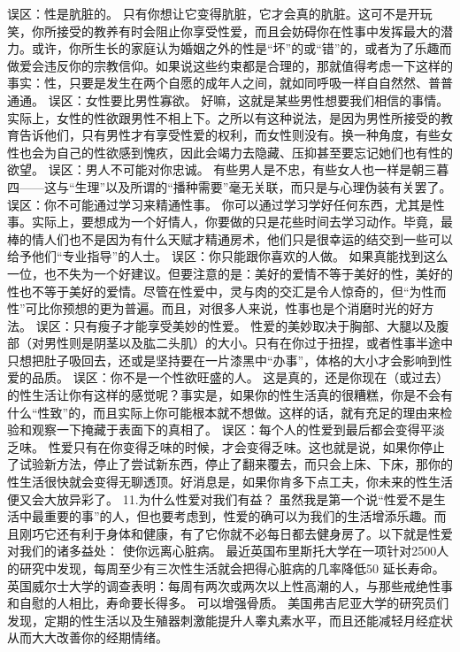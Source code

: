\documentclass[12pt,UTF8,openany]{ctexbook}
\begin{document}
误区：性是肮脏的。
只有你想让它变得肮脏，它才会真的肮脏。这可不是开玩笑，你所接受的教养有时会阻止你享受性爱，而且会妨碍你在性事中发挥最大的潜力。或许，你所生长的家庭认为婚姻之外的性是“坏”的或“错”的，或者为了乐趣而做爱会违反你的宗教信仰。如果说这些约束都是合理的，那就值得考虑一下这样的事实：性，只要是发生在两个自愿的成年人之间，就如同呼吸一样自自然然、普普通通。
误区：女性要比男性寡欲。
好嘛，这就是某些男性想要我们相信的事情。实际上，女性的性欲跟男性不相上下。之所以有这种说法，是因为男性所接受的教育告诉他们，只有男性才有享受性爱的权利，而女性则没有。换一种角度，有些女性也会为自己的性欲感到愧疚，因此会竭力去隐藏、压抑甚至要忘记她们也有性的欲望。
误区：男人不可能对你忠诚。
有些男人是不忠，有些女人也一样是朝三暮四——这与“生理”以及所谓的“播种需要”毫无关联，而只是与心理伪装有关罢了。
误区：你不可能通过学习来精通性事。
你可以通过学习学好任何东西，尤其是性事。实际上，要想成为一个好情人，你要做的只是花些时间去学习动作。毕竟，最棒的情人们也不是因为有什么天赋才精通房术，他们只是很幸运的结交到一些可以给予他们“专业指导”的人士。
误区：你只能跟你喜欢的人做。
如果真能找到这么一位，也不失为一个好建议。但要注意的是：美好的爱情不等于美好的性，美好的性也不等于美好的爱情。尽管在性爱中，灵与肉的交汇是令人惊奇的，但“为性而性”可比你预想的更为普遍。而且，对很多人来说，性事也是个消磨时光的好方法。
误区：只有瘦子才能享受美妙的性爱。
性爱的美妙取决于胸部、大腿以及腹部（对男性则是阴茎以及肱二头肌）的大小。只有在你过于扭捏，或者性事半途中只想把肚子吸回去，还或是坚持要在一片漆黑中“办事”，体格的大小才会影响到性爱的品质。
误区：你不是一个性欲旺盛的人。
这是真的，还是你现在（或过去）的性生活让你有这样的感觉呢？事实是，如果你的性生活真的很糟糕，你是不会有什么“性致”的，而且实际上你可能根本就不想做。这样的话，就有充足的理由来检验和观察一下掩藏于表面下的真相了。
误区：每个人的性爱到最后都会变得平淡乏味。
性爱只有在你变得乏味的时候，才会变得乏味。这也就是说，如果你停止了试验新方法，停止了尝试新东西，停止了翻来覆去，而只会上床、下床，那你的性生活很快就会变得无聊透顶。好消息是，如果你肯多下点工夫，你未来的性生活便又会大放异彩了。
11.为什么性爱对我们有益？
虽然我是第一个说“性爱不是生活中最重要的事”的人，但也要考虑到，性爱的确可以为我们的生活增添乐趣。而且刚巧它还有利于身体和健康，有了它你就不必每日都去健身房了。以下就是性爱对我们的诸多益处：
使你远离心脏病。
最近英国布里斯托大学在一项针对2500人的研究中发现，每周至少有三次性生活就会把得心脏病的几率降低50%
延长寿命。
英国威尔士大学的调查表明：每周有两次或两次以上性高潮的人，与那些戒绝性事和自慰的人相比，寿命要长得多。
可以增强骨质。
美国弗吉尼亚大学的研究员们发现，定期的性生活以及生殖器刺激能提升人睾丸素水平，而且还能减轻月经症状从而大大改善你的经期情绪。
\end{document}
